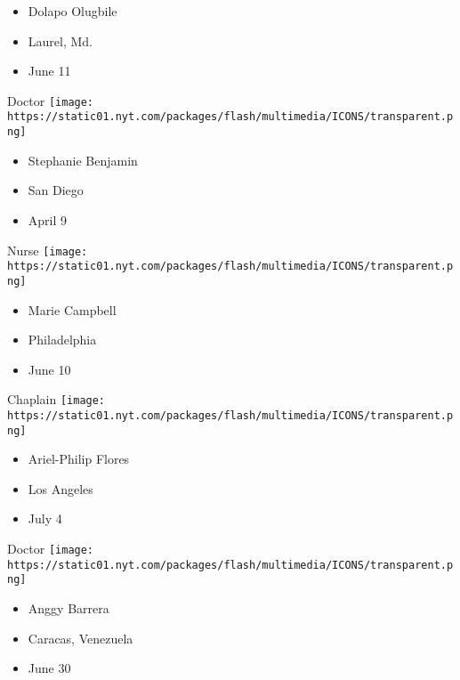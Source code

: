 \begin{itemize}
\tightlist
\item
  Dolapo Olugbile
\item
  Laurel, Md.
\item
  June 11
\end{itemize}

\protect\hyperlink{item-stephanie-benjamin}{}

Doctor
\texttt{[image: https://static01.nyt.com/packages/flash/multimedia/ICONS/transparent.png]}

\begin{itemize}
\tightlist
\item
  Stephanie Benjamin
\item
  San Diego
\item
  April 9
\end{itemize}

\protect\hyperlink{item-marie-campbell}{}

Nurse
\texttt{[image: https://static01.nyt.com/packages/flash/multimedia/ICONS/transparent.png]}

\begin{itemize}
\tightlist
\item
  Marie Campbell
\item
  Philadelphia
\item
  June 10
\end{itemize}

\protect\hyperlink{item-ariel-philip-flores}{}

Chaplain
\texttt{[image: https://static01.nyt.com/packages/flash/multimedia/ICONS/transparent.png]}

\begin{itemize}
\tightlist
\item
  Ariel-Philip Flores
\item
  Los Angeles
\item
  July 4
\end{itemize}

\protect\hyperlink{item-anggy-barrera}{}

Doctor
\texttt{[image: https://static01.nyt.com/packages/flash/multimedia/ICONS/transparent.png]}

\begin{itemize}
\tightlist
\item
  Anggy Barrera
\item
  Caracas, Venezuela
\item
  June 30
\end{itemize}


